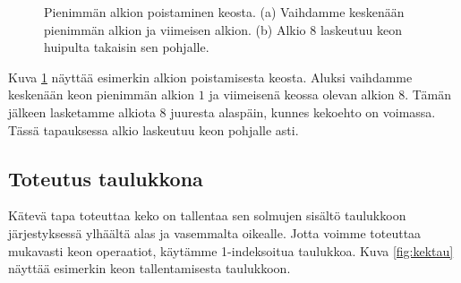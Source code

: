 \begin{figure}
\center
{}
\caption{Pienimmän alkion poistaminen keosta. (a) Vaihdamme keskenään
pienimmän alkion ja viimeisen alkion. (b) Alkio 8 laskeutuu keon
huipulta takaisin sen pohjalle.}
\label{fig:kekpoi}
\end{figure}

Kuva \ref{fig:kekpoi} näyttää esimerkin alkion poistamisesta keosta.
Aluksi vaihdamme keskenään keon pienimmän alkion $1$
ja viimeisenä keossa olevan alkion $8$.
Tämän jälkeen lasketamme alkiota $8$ juuresta alaspäin,
kunnes kekoehto on voimassa.
Tässä tapauksessa alkio laskeutuu keon pohjalle asti.

\subsection{Toteutus taulukkona}

Kätevä tapa toteuttaa keko on tallentaa sen solmujen
sisältö taulukkoon järjestyksessä ylhäältä alas ja vasemmalta oikealle.
Jotta voimme toteuttaa mukavasti keon operaatiot,
käytämme 1-indeksoitua taulukkoa.
Kuva \ref{fig:kektau} näyttää esimerkin keon tallentamisesta taulukkoon.

